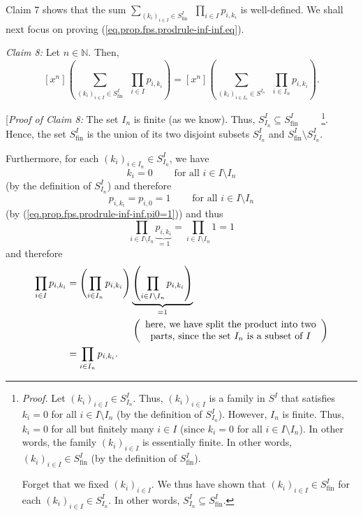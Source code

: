 Claim 7 shows that the sum $\sum_{\left(  k_{i}\right)  _{i\in I}\in
S_{\operatorname*{fin}}^{I}}\ \ \prod_{i\in I}p_{i,k_{i}}$ is well-defined. We
shall next focus on proving (\ref{eq.prop.fps.prodrule-inf-inf.eq}).

\begin{statement}
\textit{Claim 8:} Let $n\in\mathbb{N}$. Then,
\[
\left[  x^{n}\right]  \left(  \sum_{\left(  k_{i}\right)  _{i\in I}\in
S_{\operatorname*{fin}}^{I}}\ \ \prod_{i\in I}p_{i,k_{i}}\right)  =\left[
x^{n}\right]  \left(  \sum_{\left(  k_{i}\right)  _{i\in I_{n}}\in S^{I_{n}}%
}\ \ \prod_{i\in I_{n}}p_{i,k_{i}}\right)  .
\]

\end{statement}

[\textit{Proof of Claim 8:} The set $I_{n}$ is finite (as we know). Thus,
$S_{I_{n}}^{I}\subseteq S_{\operatorname*{fin}}^{I}$%
\ \ \ \ \footnote{\textit{Proof.} Let $\left(  k_{i}\right)  _{i\in I}\in
S_{I_{n}}^{I}$. Thus, $\left(  k_{i}\right)  _{i\in I}$ is a family in $S^{I}$
that satisfies $k_{i}=0$ for all $i\in I\setminus I_{n}$ (by the definition of
$S_{I_{n}}^{I}$). However, $I_{n}$ is finite. Thus, $k_{i}=0$ for all but
finitely many $i\in I$ (since $k_{i}=0$ for all $i\in I\setminus I_{n}$). In
other words, the family $\left(  k_{i}\right)  _{i\in I}$ is essentially
finite. In other words, $\left(  k_{i}\right)  _{i\in I}\in
S_{\operatorname*{fin}}^{I}$ (by the definition of $S_{\operatorname*{fin}%
}^{I}$).
\par
Forget that we fixed $\left(  k_{i}\right)  _{i\in I}$. We thus have shown
that $\left(  k_{i}\right)  _{i\in I}\in S_{\operatorname*{fin}}^{I}$ for each
$\left(  k_{i}\right)  _{i\in I}\in S_{I_{n}}^{I}$. In other words, $S_{I_{n}%
}^{I}\subseteq S_{\operatorname*{fin}}^{I}$.}. Hence, the set
$S_{\operatorname*{fin}}^{I}$ is the union of its two disjoint subsets
$S_{I_{n}}^{I}$ and $S_{\operatorname*{fin}}^{I}\setminus S_{I_{n}}^{I}$.

Furthermore, for each $\left(  k_{i}\right)  _{i\in I_{n}}\in S_{I_{n}}^{I}$,
we have%
\[
k_{i}=0\ \ \ \ \ \ \ \ \ \ \text{for all }i\in I\setminus I_{n}%
\]
(by the definition of $S_{I_{n}}^{I}$) and therefore%
\[
p_{i,k_{i}}=p_{i,0}=1\ \ \ \ \ \ \ \ \ \ \text{for all }i\in I\setminus I_{n}%
\]
(by (\ref{eq.prop.fps.prodrule-inf-inf.pi0=1})) and thus%
\[
\prod_{i\in I\setminus I_{n}}\underbrace{p_{i,k_{i}}}_{=1}=\prod_{i\in
I\setminus I_{n}}1=1
\]
and therefore%
\begin{align}
\prod_{i\in I}p_{i,k_{i}}  &  =\left(  \prod_{i\in I_{n}}p_{i,k_{i}}\right)
\underbrace{\left(  \prod_{i\in I\setminus I_{n}}p_{i,k_{i}}\right)  }%
_{=1}\nonumber\\
&  \ \ \ \ \ \ \ \ \ \ \ \ \ \ \ \ \ \ \ \ \left(
\begin{array}
[c]{c}%
\text{here, we have split the product into two}\\
\text{parts, since the set }I_{n}\text{ is a subset of }I
\end{array}
\right) \nonumber\\
&  =\prod_{i\in I_{n}}p_{i,k_{i}}.
\label{pf.prop.fps.prodrule-fin-inf.c8.pf.1}%
\end{align}


